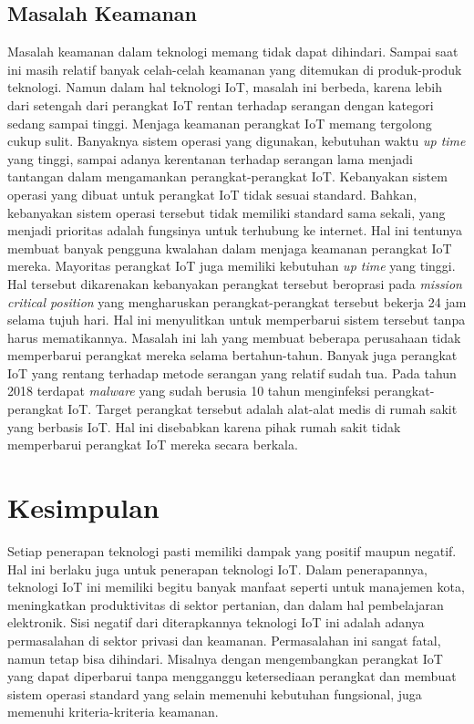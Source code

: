 \documentclass[12pt, letterpaper]{article}
\begin{document}
\subsection{Masalah Keamanan}
Masalah keamanan dalam teknologi memang tidak dapat dihindari. Sampai saat ini masih relatif banyak celah-celah keamanan yang ditemukan di produk-produk teknologi. Namun dalam hal teknologi IoT, masalah ini berbeda, karena lebih dari setengah dari perangkat IoT rentan terhadap serangan dengan kategori sedang sampai tinggi. \cite{threatpost20}
\newline
\indent
Menjaga keamanan perangkat IoT memang tergolong cukup sulit. Banyaknya sistem operasi yang digunakan, kebutuhan waktu \textit{up time} yang tinggi, sampai adanya kerentanan terhadap serangan lama menjadi tantangan dalam mengamankan perangkat-perangkat IoT. 
\newline
\indent
Kebanyakan sistem operasi yang dibuat untuk perangkat IoT tidak sesuai standard. Bahkan, kebanyakan sistem operasi tersebut tidak memiliki standard sama sekali, yang menjadi prioritas adalah fungsinya untuk terhubung ke internet. \cite{secledger17} Hal ini tentunya membuat banyak pengguna kwalahan dalam menjaga keamanan perangkat IoT mereka.
\newline
\indent
Mayoritas perangkat IoT juga memiliki kebutuhan \textit{up time} yang tinggi. Hal tersebut dikarenakan kebanyakan perangkat tersebut beroprasi pada \textit{mission critical position} yang mengharuskan perangkat-perangkat tersebut bekerja 24 jam selama tujuh hari. Hal ini menyulitkan untuk memperbarui sistem tersebut tanpa harus mematikannya. Masalah ini lah yang membuat beberapa perusahaan tidak memperbarui perangkat mereka selama bertahun-tahun.
\newline
\indent
Banyak juga perangkat IoT yang rentang terhadap metode serangan yang relatif sudah tua. Pada tahun 2018 terdapat \textit{malware} yang sudah berusia 10 tahun menginfeksi perangkat-perangkat IoT. \cite{futurum20} Target perangkat tersebut adalah alat-alat medis di rumah sakit yang berbasis IoT. Hal ini disebabkan karena pihak rumah sakit tidak memperbarui perangkat IoT mereka secara berkala.

\newpage
\section*{Kesimpulan}
Setiap penerapan teknologi pasti memiliki dampak yang positif maupun negatif. Hal ini berlaku juga untuk penerapan teknologi IoT. Dalam penerapannya, teknologi IoT ini memiliki begitu banyak manfaat seperti untuk manajemen kota, meningkatkan produktivitas di sektor pertanian, dan dalam hal pembelajaran elektronik. Sisi negatif dari diterapkannya teknologi IoT ini adalah adanya permasalahan di sektor privasi dan keamanan. Permasalahan ini sangat fatal, namun tetap bisa dihindari.
Misalnya dengan mengembangkan perangkat IoT yang dapat diperbarui tanpa mengganggu ketersediaan perangkat dan membuat sistem operasi standard yang selain memenuhi kebutuhan fungsional, juga memenuhi kriteria-kriteria keamanan.

\newpage
\printbibliography[title=Daftar Pustaka]
\end{document}
